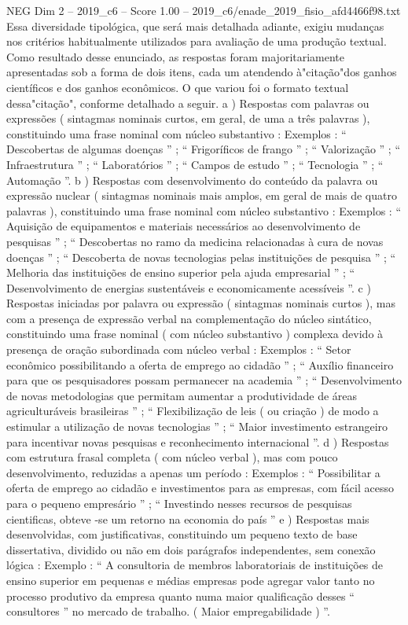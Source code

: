 \begin{textsample}{NEG Dim 2 – 2019\_c6 – Score 1.00 – 2019\_c6/enade\_2019\_fisio\_afd4466f98.txt}
Essa diversidade tipológica, que será mais detalhada adiante, exigiu mudanças nos critérios habitualmente utilizados para avaliação de uma produção textual.
Como resultado desse enunciado, as respostas foram majoritariamente apresentadas sob a forma de dois itens, cada um atendendo à"citação"dos ganhos científicos e dos ganhos econômicos.
O que variou foi o formato textual dessa"citação", conforme detalhado a seguir. a ) Respostas com palavras ou expressões ( sintagmas nominais curtos, em geral, de uma a três palavras ), constituindo uma frase nominal com núcleo substantivo : Exemplos : “ Descobertas de algumas doenças ” ; “ Frigoríficos de frango ” ; “ Valorização ” ; “ Infraestrutura ” ; “ Laboratórios ” ; “ Campos de estudo ” ; “ Tecnologia ” ; “ Automação ”. b ) Respostas com desenvolvimento do conteúdo da palavra ou expressão nuclear ( sintagmas nominais mais amplos, em geral de mais de quatro palavras ), constituindo uma frase nominal com núcleo substantivo : Exemplos : “ Aquisição de equipamentos e materiais necessários ao desenvolvimento de pesquisas ” ; “ Descobertas no ramo da medicina relacionadas à cura de novas doenças ” ; “ Descoberta de novas tecnologias pelas instituições de pesquisa ” ; “ Melhoria das instituições de ensino superior pela ajuda empresarial ” ; “ Desenvolvimento de energias sustentáveis e economicamente acessíveis ”. c ) Respostas iniciadas por palavra ou expressão ( sintagmas nominais curtos ), mas com a presença de expressão verbal na complementação do núcleo sintático, constituindo uma frase nominal ( com núcleo substantivo ) complexa devido à presença de oração subordinada com núcleo verbal : Exemplos : “ Setor econômico possibilitando a oferta de emprego ao cidadão ” ; “ Auxílio financeiro para que os pesquisadores possam permanecer na academia ” ; “ Desenvolvimento de novas metodologias que permitam aumentar a produtividade de áreas agriculturáveis brasileiras ” ; “ Flexibilização de leis ( ou criação ) de modo a estimular a utilização de novas tecnologias ” ; “ Maior investimento estrangeiro para incentivar novas pesquisas e reconhecimento internacional ”. d ) Respostas com estrutura frasal completa ( com núcleo verbal ), mas com pouco desenvolvimento, reduzidas a apenas um período : Exemplos : “ Possibilitar a oferta de emprego ao cidadão e investimentos para as empresas, com fácil acesso para o pequeno empresário ” ; “ Investindo nesses recursos de pesquisas cientificas, obteve -se um retorno na economia do país ” e ) Respostas mais desenvolvidas, com justificativas, constituindo um pequeno texto de base dissertativa, dividido ou não em dois parágrafos independentes, sem conexão lógica : Exemplo : “ A consultoria de membros laboratoriais de instituições de ensino superior em pequenas e médias empresas pode agregar valor tanto no processo produtivo da empresa quanto numa maior qualificação desses “ consultores ” no mercado de trabalho. ( Maior empregabilidade ) ”.

\end{textsample}
